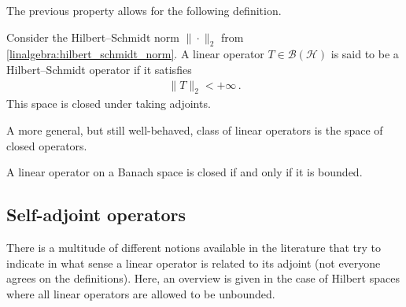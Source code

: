     The previous property allows for the following definition.

    \begin{example}\label{functional:hilbert_schmidt}
        Consider the Hilbert--Schmidt norm $\|\cdot\|_2$ from \cref{linalgebra:hilbert_schmidt_norm}. A linear operator $T\in\mathcal{B}(\mathcal{H})$ is said to be a Hilbert--Schmidt operator if it satisfies
        \begin{gather}
            \|T\|_2<+\infty\,.
        \end{gather}
        This space is closed under taking adjoints.
    \end{example}

    A more general, but still well-behaved, class of linear operators is the space of closed operators.

    \begin{theorem}
        A linear operator on a Banach space is closed if and only if it is bounded.
    \end{theorem}

\subsection{Self-adjoint operators}

    There is a multitude of different notions available in the literature that try to indicate in what sense a linear operator is related to its adjoint (not everyone agrees on the definitions). Here, an overview is given in the case of Hilbert spaces where all linear operators are allowed to be unbounded.

